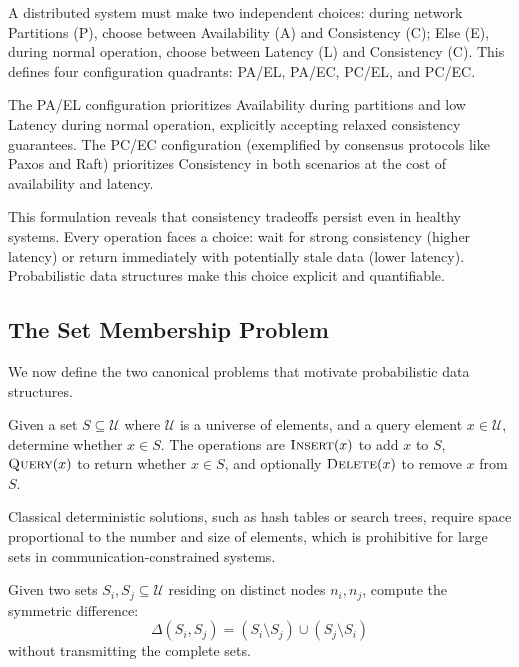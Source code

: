 \begin{definition}
    A distributed system must make two independent choices: during network Partitions (P), choose between Availability (A) and Consistency (C); Else (E), during normal operation, choose between Latency (L) and Consistency (C). This defines four configuration quadrants: PA/EL, PA/EC, PC/EL, and PC/EC.
\end{definition}

The PA/EL configuration prioritizes Availability during partitions and low Latency during normal operation, explicitly accepting relaxed consistency guarantees. The PC/EC configuration (exemplified by consensus protocols like Paxos and Raft) prioritizes Consistency in both scenarios at the cost of availability and latency.

This formulation reveals that consistency tradeoffs persist even in healthy systems. Every operation faces a choice: wait for strong consistency (higher latency) or return immediately with potentially stale data (lower latency). Probabilistic data structures make this choice explicit and quantifiable.

\subsection{The Set Membership Problem}

We now define the two canonical problems that motivate probabilistic data structures.

\begin{definition}
    Given a set $S \subseteq \mathcal{U}$ where $\mathcal{U}$ is a universe of elements, and a query element $x \in \mathcal{U}$, determine whether $x \in S$. The operations are $\textsc{Insert}(x)$ to add $x$ to $S$, $\textsc{Query}(x)$ to return whether $x \in S$, and optionally $\textsc{Delete}(x)$ to remove $x$ from $S$.
\end{definition}

Classical deterministic solutions, such as hash tables or search trees, require space proportional to the number and size of elements, which is prohibitive for large sets in communication-constrained systems.

\begin{definition}
    Given two sets $S_i, S_j \subseteq \mathcal{U}$ residing on distinct nodes $n_i, n_j$, compute the symmetric difference:
    \begin{equation}
        \Delta(S_i, S_j) = (S_i \setminus S_j) \cup (S_j \setminus S_i)
    \end{equation}
    without transmitting the complete sets.
\end{definition}

